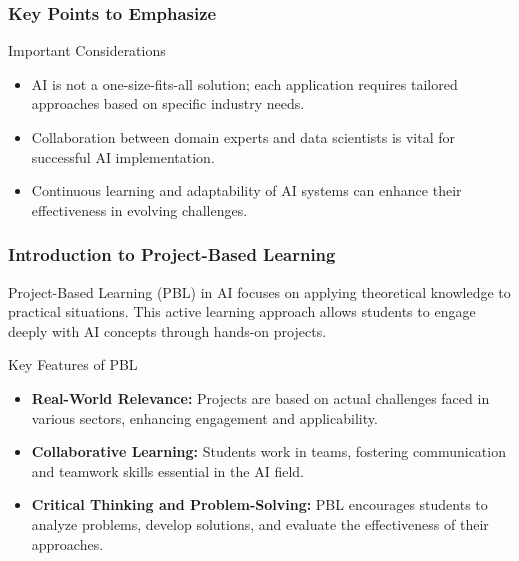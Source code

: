 \documentclass{beamer}
\begin{document}
\begin{frame}[fragile]
    \frametitle{Key Points to Emphasize}
    \begin{block}{Important Considerations}
        \begin{itemize}
            \item AI is not a one-size-fits-all solution; each application requires tailored approaches based on specific industry needs.
            \item Collaboration between domain experts and data scientists is vital for successful AI implementation.
            \item Continuous learning and adaptability of AI systems can enhance their effectiveness in evolving challenges.
        \end{itemize}
    \end{block}
\end{frame}

\begin{frame}[fragile]
    \frametitle{Introduction to Project-Based Learning}
    Project-Based Learning (PBL) in AI focuses on applying theoretical knowledge to practical situations. This active learning approach allows students to engage deeply with AI concepts through hands-on projects.
    
    \begin{block}{Key Features of PBL}
        \begin{itemize}
            \item \textbf{Real-World Relevance:} Projects are based on actual challenges faced in various sectors, enhancing engagement and applicability.
            \item \textbf{Collaborative Learning:} Students work in teams, fostering communication and teamwork skills essential in the AI field.
            \item \textbf{Critical Thinking and Problem-Solving:} PBL encourages students to analyze problems, develop solutions, and evaluate the effectiveness of their approaches.
        \end{itemize}
    \end{block}    
\end{frame}
\end{document}
